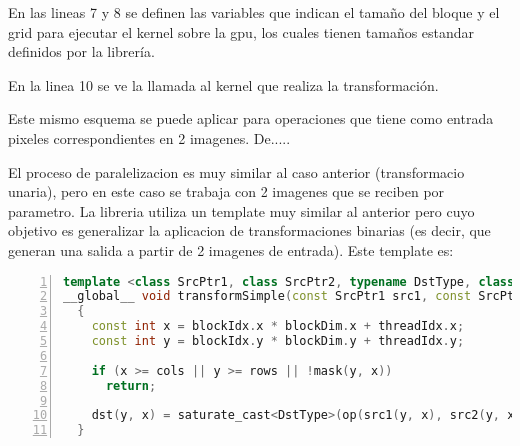 \documentclass[a4paper,10pt]{report}
\begin{document}
En las lineas 7 y 8 se definen las variables que indican el tamaño del bloque y el grid para ejecutar el kernel sobre la gpu, los cuales tienen tamaños estandar definidos por la librería.

En la linea 10 se ve la llamada al kernel que realiza la transformación.









Este mismo esquema se puede aplicar para operaciones que tiene como entrada pixeles correspondientes en 2 imagenes. De.....

El proceso de paralelizacion es muy similar al caso anterior (transformacio unaria), pero en este caso se trabaja con 2 imagenes que se reciben por parametro. 
La libreria utiliza un template muy similar al anterior pero cuyo objetivo es generalizar la aplicacion de transformaciones binarias (es decir, que generan una salida a partir de 2 imagenes de entrada).
Este template es:
 
\begin{lstlisting}[frame=bt,title={aa},caption={modules/cudev/include/opencv2/cudev/grid/detail/transform.hpp},
columns=fullflexible,numbers=left,backgroundcolor=\color{LemonChiffon1},basicstyle=\footnotesize,keywordstyle=\ttfamily\footnotesize,language=C++,stringstyle=\ttfamily,breaklines=true,xleftmargin=0.5em,xrightmargin=0pt,aboveskip=\bigskipamount,belowskip=\bigskipamount]
template <class SrcPtr1, class SrcPtr2, typename DstType, class BinOp, class MaskPtr>
__global__ void transformSimple(const SrcPtr1 src1, const SrcPtr2 src2, GlobPtr<DstType> dst, const BinOp op, const MaskPtr mask, const int rows, const int cols)
  {
    const int x = blockIdx.x * blockDim.x + threadIdx.x;
    const int y = blockIdx.y * blockDim.y + threadIdx.y;

    if (x >= cols || y >= rows || !mask(y, x))
      return;

    dst(y, x) = saturate_cast<DstType>(op(src1(y, x), src2(y, x)));
  }
\end{lstlisting}
\end{document}
